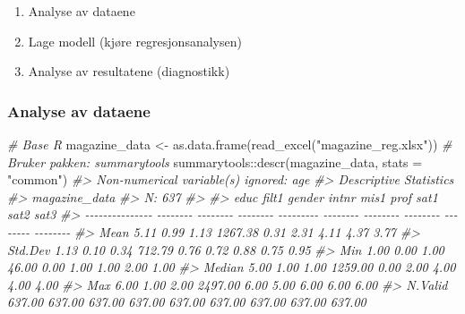 \documentclass[
]{article}
\newenvironment{Shaded}{\begin{snugshade}}{\end{snugshade}}
\newcommand{\AttributeTok}[1]{\textcolor[rgb]{0.77,0.63,0.00}{#1}}
\newcommand{\CommentTok}[1]{\textcolor[rgb]{0.56,0.35,0.01}{\textit{#1}}}
\newcommand{\FunctionTok}[1]{\textcolor[rgb]{0.00,0.00,0.00}{#1}}
\newcommand{\NormalTok}[1]{#1}
\newcommand{\OtherTok}[1]{\textcolor[rgb]{0.56,0.35,0.01}{#1}}
\newcommand{\SpecialCharTok}[1]{\textcolor[rgb]{0.00,0.00,0.00}{#1}}
\newcommand{\StringTok}[1]{\textcolor[rgb]{0.31,0.60,0.02}{#1}}
\begin{document}
\begin{enumerate}
\def\labelenumi{\arabic{enumi}.}
\item
  Analyse av dataene
\item
  Lage modell (kjøre regresjonsanalysen)
\item
  Analyse av resultatene (diagnostikk)
\end{enumerate}

\hypertarget{analyse-av-dataene-2}{%
\subsubsection{Analyse av dataene}\label{analyse-av-dataene-2}}

\begin{Shaded}
\begin{Highlighting}[]
\CommentTok{\# Base R}
\NormalTok{magazine\_data }\OtherTok{\textless{}{-}} \FunctionTok{as.data.frame}\NormalTok{(}\FunctionTok{read\_excel}\NormalTok{(}\StringTok{"magazine\_reg.xlsx"}\NormalTok{))}
\CommentTok{\# Bruker pakken: summarytools}
\NormalTok{summarytools}\SpecialCharTok{::}\FunctionTok{descr}\NormalTok{(magazine\_data, }\AttributeTok{stats =} \StringTok{"common"}\NormalTok{)}
\CommentTok{\#\textgreater{} Non{-}numerical variable(s) ignored: age}
\CommentTok{\#\textgreater{} Descriptive Statistics  }
\CommentTok{\#\textgreater{} magazine\_data  }
\CommentTok{\#\textgreater{} N: 637  }
\CommentTok{\#\textgreater{} }
\CommentTok{\#\textgreater{}                     educ    filt1   gender     intnr     mis1     prof     sat1     sat2     sat3}
\CommentTok{\#\textgreater{} {-}{-}{-}{-}{-}{-}{-}{-}{-}{-}{-}{-}{-}{-}{-} {-}{-}{-}{-}{-}{-}{-}{-} {-}{-}{-}{-}{-}{-}{-}{-} {-}{-}{-}{-}{-}{-}{-}{-} {-}{-}{-}{-}{-}{-}{-}{-}{-} {-}{-}{-}{-}{-}{-}{-}{-} {-}{-}{-}{-}{-}{-}{-}{-} {-}{-}{-}{-}{-}{-}{-}{-} {-}{-}{-}{-}{-}{-}{-}{-} {-}{-}{-}{-}{-}{-}{-}{-}}
\CommentTok{\#\textgreater{}            Mean     5.11     0.99     1.13   1267.38     0.31     2.31     4.11     4.37     3.77}
\CommentTok{\#\textgreater{}         Std.Dev     1.13     0.10     0.34    712.79     0.76     0.72     0.88     0.75     0.95}
\CommentTok{\#\textgreater{}             Min     1.00     0.00     1.00     46.00     0.00     1.00     1.00     2.00     1.00}
\CommentTok{\#\textgreater{}          Median     5.00     1.00     1.00   1259.00     0.00     2.00     4.00     4.00     4.00}
\CommentTok{\#\textgreater{}             Max     6.00     1.00     2.00   2497.00     6.00     5.00     6.00     6.00     6.00}
\CommentTok{\#\textgreater{}         N.Valid   637.00   637.00   637.00    637.00   637.00   637.00   637.00   637.00   637.00}

\end{Highlighting}
\end{Shaded}
\end{document}
